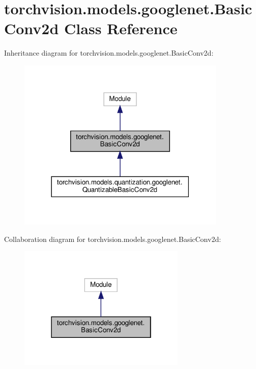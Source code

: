\hypertarget{classtorchvision_1_1models_1_1googlenet_1_1BasicConv2d}{}\section{torchvision.\+models.\+googlenet.\+Basic\+Conv2d Class Reference}
\label{classtorchvision_1_1models_1_1googlenet_1_1BasicConv2d}


Inheritance diagram for torchvision.\+models.\+googlenet.\+Basic\+Conv2d\+:
\nopagebreak
\begin{figure}[H]
\begin{center}
\leavevmode
\includegraphics[width=282pt]{classtorchvision_1_1models_1_1googlenet_1_1BasicConv2d__inherit__graph}
\end{center}
\end{figure}


Collaboration diagram for torchvision.\+models.\+googlenet.\+Basic\+Conv2d\+:
\nopagebreak
\begin{figure}[H]
\begin{center}
\leavevmode
\includegraphics[width=226pt]{classtorchvision_1_1models_1_1googlenet_1_1BasicConv2d__coll__graph}
\end{center}
\end{figure}
